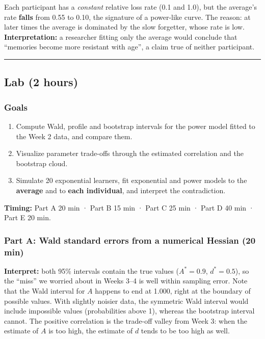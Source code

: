 Each participant has a \emph{constant} relative loss rate (0.1 and 1.0),
but the average's rate \textbf{falls} from 0.55 to 0.10, the signature
of a power-like curve. The reason: at later times the average is
dominated by the slow forgetter, whose rate is low.
\textbf{Interpretation:} a researcher fitting only the average would
conclude that ``memories become more resistant with age'', a claim true
of neither participant.

\begin{center}\rule{0.5\linewidth}{0.5pt}\end{center}


\subsection{Lab (2 hours)}

\subsubsection{Goals}

\begin{enumerate}
\def\labelenumi{\arabic{enumi}.}
\tightlist
\item
  Compute Wald, profile and bootstrap intervals for the power model
  fitted to the Week 2 data, and compare them.
\item
  Visualize parameter trade-offs through the estimated correlation and
  the bootstrap cloud.
\item
  Simulate 20 exponential learners, fit exponential and power models to
  the \textbf{average} and to \textbf{each individual}, and interpret
  the contradiction.
\end{enumerate}

\textbf{Timing:} Part A 20 min · Part B 15 min · Part C 25 min · Part D
40 min · Part E 20 min.

\subsubsection{Part A: Wald standard errors from a numerical Hessian (20
min)}

\textbf{Interpret:} both 95\% intervals contain the true values
(\(A^\ast = 0.9\), \(d^\ast = 0.5\)), so the ``miss'' we worried about
in Weeks 3--4 is well within sampling error. Note that the Wald interval
for \(A\) happens to end at 1.000, right at the boundary of possible
values. With slightly noisier data, the symmetric Wald interval would
include impossible values (probabilities above 1), whereas the bootstrap
interval cannot. The positive correlation is the trade-off valley from
Week 3: when the estimate of \(A\) is too high, the estimate of \(d\)
tends to be too high as well.

